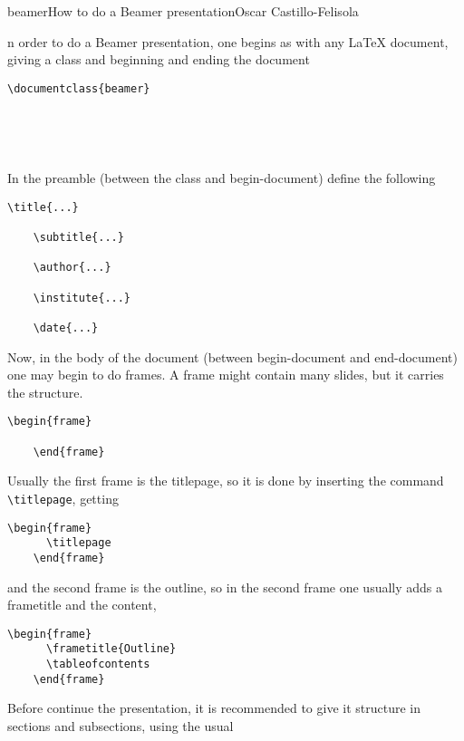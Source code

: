 \begin{article}[2]{beamer}{How to do a Beamer presentation}{Oscar Castillo-Felisola}

  n order to do a Beamer presentation, one begins as with any LaTeX document, giving a class and beginning and ending the document
  \begin{lstlisting}[style=LaTeX]
    \documentclass{beamer}

    

    
  \end{lstlisting}

  In the preamble (between the class and begin-document) define the following
  \begin{lstlisting}[style=LaTeX]
    \title{...}

    \subtitle{...}

    \author{...}

    \institute{...}

    \date{...}
  \end{lstlisting}

  Now, in the body of the document (between begin-document and end-document)  one may begin to do frames. A frame might contain many slides, but it carries the structure.
  \begin{lstlisting}[style=LaTeX]
    \begin{frame}

    \end{frame}
  \end{lstlisting}

  Usually the first frame is the titlepage, so it is done by inserting the command \lstinline[style=LaTeX]!\titlepage!, getting
  \begin{lstlisting}[style=LaTeX]
    \begin{frame}
      \titlepage
    \end{frame}
  \end{lstlisting}
  and the second frame is the outline, so in the second frame one usually adds a frametitle and the content,
  \begin{lstlisting}[style=LaTeX]
    \begin{frame}
      \frametitle{Outline}
      \tableofcontents
    \end{frame}
  \end{lstlisting}

  Before continue the presentation, it is recommended to give it structure in sections and subsections, using the usual


\end{article}
